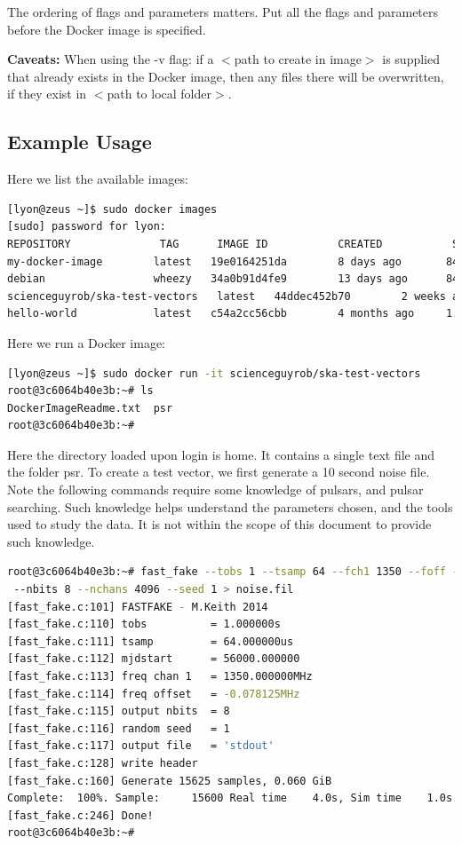 \documentclass[preprint,authoryear,5p,twocolumn]{elsarticle_mod}
\begin{document}
The ordering of flags and parameters matters. Put all the flags and parameters before the Docker image is specified. 

\textbf{Caveats:} \newline
When using the -v flag: if a $<$path to create in image$>$ is supplied that already exists in the Docker image, then any files there will be overwritten, if they exist in $<$path to local folder$>$. 

\subsection{Example Usage} 
\noindent\begin{minipage}{.95\textwidth}
Here we list the available images: 
\begin{lstlisting}[language=bash]
[lyon@zeus ~]$ sudo docker images 
[sudo] password for lyon:  
REPOSITORY              TAG      IMAGE ID           CREATED           SIZE 
my-docker-image        latest   19e0164251da        8 days ago       84.91MB 
debian                 wheezy   34a0b91d4fe9        13 days ago      84.91 MB 
scienceguyrob/ska-test-vectors   latest   44ddec452b70        2 weeks ago      3.521 GB 
hello-world            latest   c54a2cc56cbb        4 months ago     1.848 kB 
\end{lstlisting}

Here we run a Docker image: 

\begin{lstlisting}[language=bash]
[lyon@zeus ~]$ sudo docker run -it scienceguyrob/ska-test-vectors 
root@3c6064b40e3b:~# ls 
DockerImageReadme.txt  psr 
root@3c6064b40e3b:~#
\end{lstlisting}

Here the directory loaded upon login is home. It contains a single text file and the folder psr. To create a test vector, we first generate a 10 second noise file. Note the following commands require some knowledge of pulsars, and pulsar searching. Such knowledge helps understand the parameters chosen, and the tools used to study the data. It is not within the scope of this document to provide such knowledge.
\begin{lstlisting}[language=bash]
root@3c6064b40e3b:~# fast_fake --tobs 1 --tsamp 64 --fch1 1350 --foff -0.078125
 --nbits 8 --nchans 4096 --seed 1 > noise.fil 
[fast_fake.c:101] FASTFAKE - M.Keith 2014 
[fast_fake.c:110] tobs          = 1.000000s 
[fast_fake.c:111] tsamp         = 64.000000us 
[fast_fake.c:112] mjdstart      = 56000.000000 
[fast_fake.c:113] freq chan 1   = 1350.000000MHz 
[fast_fake.c:114] freq offset   = -0.078125MHz 
[fast_fake.c:115] output nbits  = 8 
[fast_fake.c:116] random seed   = 1 
[fast_fake.c:117] output file   = 'stdout' 
[fast_fake.c:128] write header 
[fast_fake.c:160] Generate 15625 samples, 0.060 GiB 
Complete:  100%. Sample:     15600 Real time    4.0s, Sim time    1.0s. Speed  15.23MiB/ss 
[fast_fake.c:246] Done! 
root@3c6064b40e3b:~#
\end{lstlisting}
\end{minipage}\clearpage
\end{document}
